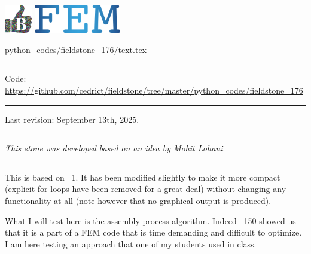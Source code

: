 \noindent
\includegraphics[height=1.25cm]{images/pictograms/benchmark}
\includegraphics[height=1.25cm]{images/pictograms/FEM}


\begin{flushright} {\tiny {\color{gray} python\_codes/fieldstone\_176/text.tex}} \end{flushright}

%

\par\noindent\rule{\textwidth}{0.4pt}

\begin{center}
\inpython
{\small Code: \url{https://github.com/cedrict/fieldstone/tree/master/python_codes/fieldstone_176}}
\end{center}

\par\noindent\rule{\textwidth}{0.4pt}

Last revision: September 13th, 2025.

\par\noindent\rule{\textwidth}{0.4pt}

{\sl This stone was developed based on an idea by Mohit Lohani}. 

\par\noindent\rule{\textwidth}{0.4pt}


This \stone is based on \stone~1. It has been modified slightly to make it more compact
(explicit for loops have been removed for a great deal) without
changing any functionality at all (note however that no graphical output is produced).

What I will test here is the assembly process algorithm. Indeed \stone~150 showed us that 
it is a part of a FEM code that is time demanding and difficult to optimize. 
I am here testing an approach that one of my students used in class.

